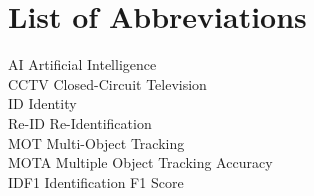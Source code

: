 \chapter*{List of Abbreviations}

AI \quad Artificial Intelligence \\
CCTV \quad Closed-Circuit Television \\
ID \quad Identity \\
Re-ID \quad Re-Identification \\
MOT \quad Multi-Object Tracking \\
MOTA \quad Multiple Object Tracking Accuracy \\
IDF1 \quad Identification F1 Score \\